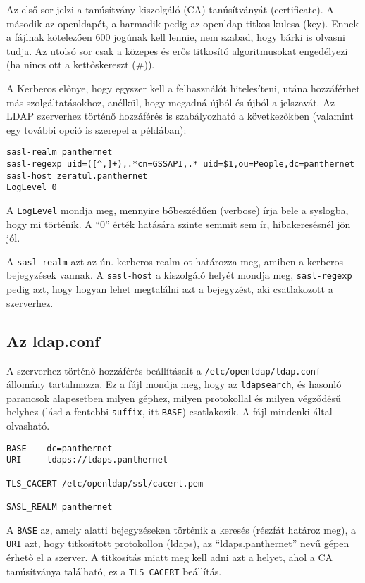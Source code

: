 Az első sor jelzi a tanúsítvány-kiszolgáló (CA) tanúsítványát (certificate). A második az openldapét, a harmadik pedig
az openldap titkos kulcsa (key). Ennek a fájlnak kötelezően 600 jogúnak kell lennie, nem szabad, hogy bárki is olvasni
tudja. Az utolsó sor csak a közepes és erős titkosító algoritmusokat engedélyezi (ha nincs ott a kettőskereszt (\#)).


A Kerberos előnye, hogy egyszer kell a felhasználót hitelesíteni, utána hozzáférhet más szolgáltatásokhoz, anélkül, hogy
megadná újból és újból a jelszavát. Az LDAP szerverhez történő hozzáférés is szabályozható a következőkben (valamint egy
további opció is szerepel a példában):


\begin{Verbatim}[frame=single]
sasl-realm panthernet
sasl-regexp uid=([^,]+),.*cn=GSSAPI,.* uid=$1,ou=People,dc=panthernet
sasl-host zeratul.panthernet
LogLevel 0
\end{Verbatim}

A \texttt{LogLevel} mondja meg, mennyire bőbeszédűen (verbose) írja bele a syslogba, hogy mi történik. A ``0'' érték
hatására szinte semmit sem ír, hibakeresésnél jön jól.

A \texttt{sasl-realm} azt az ún. kerberos realm-ot határozza meg, amiben a kerberos bejegyzések vannak. A
\texttt{sasl-host} a kiszolgáló helyét mondja meg, \texttt{sasl-regexp} pedig azt, hogy hogyan lehet megtalálni azt a
bejegyzést, aki csatlakozott a szerverhez.


\subsection{Az ldap.conf}
A szerverhez történő hozzáférés beállításait a \texttt{/etc/openldap/ldap.conf} állomány tartalmazza.
Ez a fájl mondja meg, hogy az \texttt{ldapsearch}, és hasonló parancsok alapesetben milyen géphez, milyen protokollal
és milyen végződésű helyhez (lásd a fentebbi \texttt{suffix}, itt \texttt{BASE}) csatlakozik. A fájl mindenki által
olvasható.

\begin{Verbatim}[frame=single,label=ldap.conf]
BASE    dc=panthernet
URI     ldaps://ldaps.panthernet

TLS_CACERT /etc/openldap/ssl/cacert.pem

SASL_REALM panthernet
\end{Verbatim}


A \texttt{BASE} az, amely alatti bejegyzéseken történik a keresés (részfát határoz meg), a \texttt{URI} azt, hogy
titkosított protokollon (ldaps), az ``ldaps.panthernet'' nevű gépen érhető el a szerver. A titkosítás miatt meg kell
adni azt a helyet, ahol a CA tanúsítványa található, ez a \texttt{TLS\_CACERT} beállítás.


